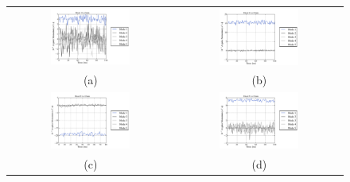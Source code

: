 \documentclass[12pt,a4paper]{article}
\begin{document}
\begin{figure}[h]
\begin{tabular}{cc}
 \includegraphics[width=0.5\textwidth]{./imgs/Lz_H1L2.pdf} & \includegraphics[width=0.5\textwidth]{./imgs/Lz_H1L12.pdf} \\
 (a) & (b) \\
 \includegraphics[width=0.5\textwidth]{./imgs/Lz_H2L12.pdf} & \includegraphics[width=0.5\textwidth]{./imgs/Lz_H3L12.pdf} \\
(c) & (d) \\

\end{tabular}
\end{figure}
\end{document}
